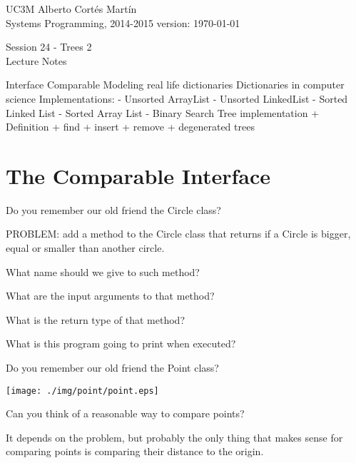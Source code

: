 \documentclass[a4paper, 9pt]{extarticle}
\newcommand{\realtitle}{Session 24 - Trees 2}
\newcommand{\separator}{\begin{center}%
\noindent\makebox[\linewidth]{\rule{0.75\paperwidth}{0.4pt}}%
\end{center}}
\begin{document}
\makebox[\linewidth]{\rule{\textwidth}{0.4pt}}
UC3M \hfill Alberto Cortés Martín\\
Systems Programming, 2014-2015 \hfill version: \today\\
\makebox[\linewidth]{\rule{\textwidth}{0.4pt}}
\begin{center}
  \Large{\realtitle}\\Lecture Notes
\end{center}
\makebox[\linewidth]{\rule{\textwidth}{0.4pt}}
\vspace{1cm}

\begin{blackboard}
Interface Comparable
Modeling real life dictionaries
Dictionaries in computer science
Implementations:
 - Unsorted ArrayList
 - Unsorted LinkedList
 - Sorted Linked List
 - Sorted Array List
 - Binary Search Tree implementation
   + Definition
   + find
   + insert
   + remove
   + degenerated trees
\end{blackboard}


\section{The Comparable Interface}

Do you remember our old friend the Circle class?


PROBLEM: add a method to the Circle class that returns if a Circle is bigger, equal or smaller than another circle.

What name should we give to such method?

What are the input arguments to that method?

What is the return type of that method?



What is this program going to print when executed?

\separator

Do you remember our old friend the Point class?

\begin{center}
  \texttt{[image: ./img/point/point.eps]}
\end{center}

Can you think of a reasonable way to compare points?

It depends on the problem, but probably the only thing that makes sense for
comparing points is comparing their distance to the origin.
\end{document}
